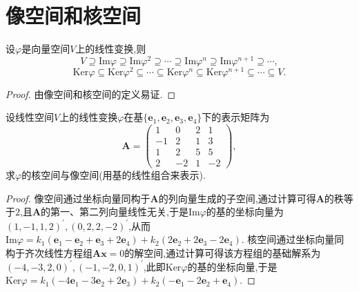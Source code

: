 \documentclass[../../main.tex]{subfiles}%
\begin{document}
\section{像空间和核空间}

\begin{proposition}\label{proposition:像空间和核空间的子空间链}
设\(\varphi\)是向量空间\(V\)上的线性变换,则
\[
V\supseteq \mathrm{Im}\varphi \supseteq \mathrm{Im}\varphi^2 \supseteq \cdots \supseteq \mathrm{Im}\varphi^n \supseteq \mathrm{Im}\varphi^{n + 1} \supseteq \cdots,
\]
\[
\mathrm{Ker}\varphi \subseteq \mathrm{Ker}\varphi ^2\subseteq \cdots \subseteq \mathrm{Ker}\varphi ^n\subseteq \mathrm{Ker}\varphi ^{n+1}\subseteq \cdots \subseteq V.
\]
\end{proposition}
\begin{proof}

由像空间和核空间的定义易证.

\end{proof}

\begin{example}
设线性空间\(V\)上的线性变换\(\varphi\)在基\(\{\boldsymbol{e}_1,\boldsymbol{e}_2,\boldsymbol{e}_3,\boldsymbol{e}_4\}\)下的表示矩阵为
\[
\boldsymbol{A}=\begin{pmatrix}
1&0&2&1\\
-1&2&1&3\\
1&2&5&5\\
2&-2&1&-2
\end{pmatrix},
\]
求\(\varphi\)的核空间与像空间(用基的线性组合来表示).
\end{example}
\begin{proof}

像空间通过坐标向量同构于\(\boldsymbol{A}\)的列向量生成的子空间,通过计算可得\(\boldsymbol{A}\)的秩等于\(2\),且\(\boldsymbol{A}\)的第一、第二列向量线性无关,于是\(\text{Im}\varphi\)的基的坐标向量为\((1,-1,1,2)^\prime,(0,2,2,-2)^\prime\),从而\(\text{Im}\varphi = k_1(\boldsymbol{e}_1 - \boldsymbol{e}_2 + \boldsymbol{e}_3 + 2\boldsymbol{e}_4)+k_2(2\boldsymbol{e}_2 + 2\boldsymbol{e}_3 - 2\boldsymbol{e}_4)\). 核空间通过坐标向量同构于齐次线性方程组\(\boldsymbol{A}\boldsymbol{x}=0\)的解空间,通过计算可得该方程组的基础解系为\((-4,-3,2,0)^\prime,(-1,-2,0,1)^\prime\),此即\(\text{Ker}\varphi\)的基的坐标向量,于是\(\text{Ker}\varphi = k_1(-4\boldsymbol{e}_1 - 3\boldsymbol{e}_2 + 2\boldsymbol{e}_3)+k_2(-\boldsymbol{e}_1 - 2\boldsymbol{e}_2 + \boldsymbol{e}_4)\).

\end{proof}
\end{document}

